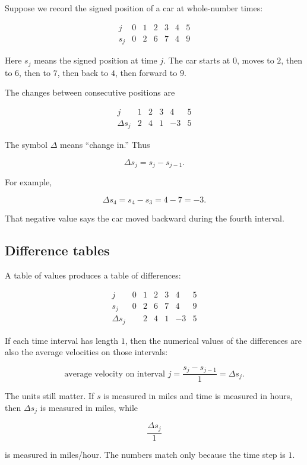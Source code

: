 Suppose we record the signed position of a car at whole-number times:

\[
\begin{array}{c|rrrrrr}
j & 0 & 1 & 2 & 3 & 4 & 5 \\ \hline
s_j & 0 & 2 & 6 & 7 & 4 & 9
\end{array}
\]

Here \(s_j\) means the signed position at time \(j\). The car starts at \(0\), moves to \(2\), then to \(6\), then to \(7\), then back to \(4\), then forward to \(9\).

The changes between consecutive positions are

\[
\begin{array}{c|rrrrr}
j & 1 & 2 & 3 & 4 & 5 \\ \hline
\Delta s_j & 2 & 4 & 1 & -3 & 5
\end{array}
\]

The symbol \(\Delta\) means ``change in.'' Thus

\[
\Delta s_j=s_j-s_{j-1}.
\]

For example,

\[
\Delta s_4=s_4-s_3=4-7=-3.
\]

That negative value says the car moved backward during the fourth interval.

\subsection{Difference tables}

A table of values produces a table of differences:

\[
\begin{array}{c|rrrrrr}
j & 0 & 1 & 2 & 3 & 4 & 5 \\ \hline
s_j & 0 & 2 & 6 & 7 & 4 & 9 \\
\Delta s_j & & 2 & 4 & 1 & -3 & 5
\end{array}
\]

If each time interval has length \(1\), then the numerical values of the differences are also the average velocities on those intervals:

\[
\text{average velocity on interval }j
=
\frac{s_j-s_{j-1}}{1}
=
\Delta s_j.
\]

The units still matter. If \(s\) is measured in miles and time is measured in hours, then \(\Delta s_j\) is measured in miles, while

\[
\frac{\Delta s_j}{1}
\]

is measured in miles/hour. The numbers match only because the time step is \(1\).

